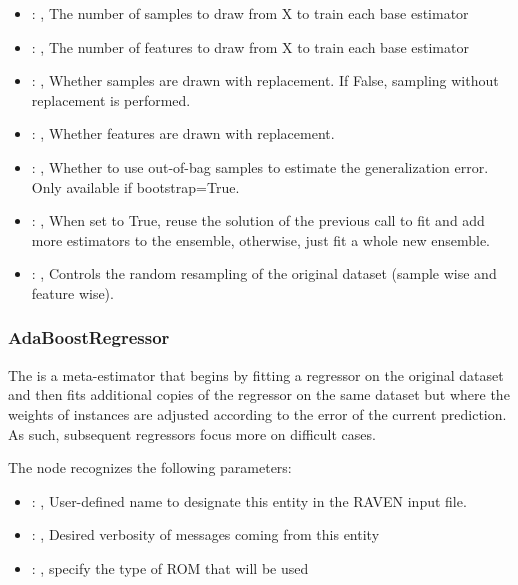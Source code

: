 \begin{itemize}
    \item {}: , 
      The number of samples to draw from X to train each base estimator

    \item {}: , 
      The number of features to draw from X to train each base estimator

    \item {}: , 
      Whether samples are drawn with replacement. If False, sampling without
      replacement is performed.

    \item {}: , 
      Whether features are drawn with replacement.

    \item {}: , 
      Whether to use out-of-bag samples to estimate the generalization error.
      Only available if bootstrap=True.

    \item {}: , 
      When set to True, reuse the solution of the previous call to fit and add more
      estimators to the ensemble, otherwise, just fit a whole new ensemble.

    \item {}: , 
      Controls the random resampling of the original dataset (sample wise and feature wise).
  \end{itemize}


\subsubsection{AdaBoostRegressor}
  The  is a meta-estimator that begins by fitting a regressor on
  the original dataset and then fits additional copies of the regressor on the same dataset
  but where the weights of instances are adjusted according to the error of the current
  prediction. As such, subsequent regressors focus more on difficult cases.

  The  node recognizes the following parameters:
    \begin{itemize}
      \item {}: , 
        User-defined name to designate this entity in the RAVEN input file.
      \item {}: , 
        Desired verbosity of messages coming from this entity
      \item {}: , 
        specify the type of ROM that will be used
  \end{itemize}

